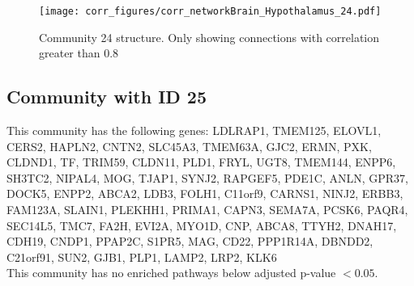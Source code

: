 \begin{figure}[h!]
\centering
\texttt{[image: corr\_figures/corr\_networkBrain\_Hypothalamus\_24.pdf]}
\caption{Community 24 structure. Only showing connections with correlation greater than 0.8}
\end{figure}




\subsection*{Community with ID 25}
This community has the following genes: LDLRAP1, TMEM125, ELOVL1, CERS2, HAPLN2, CNTN2, SLC45A3, TMEM63A, GJC2, ERMN, PXK, CLDND1, TF, TRIM59, CLDN11, PLD1, FRYL, UGT8, TMEM144, ENPP6, SH3TC2, NIPAL4, MOG, TJAP1, SYNJ2, RAPGEF5, PDE1C, ANLN, GPR37, DOCK5, ENPP2, ABCA2, LDB3, FOLH1, C11orf9, CARNS1, NINJ2, ERBB3, FAM123A, SLAIN1, PLEKHH1, PRIMA1, CAPN3, SEMA7A, PCSK6, PAQR4, SEC14L5, TMC7, FA2H, EVI2A, MYO1D, CNP, ABCA8, TTYH2, DNAH17, CDH19, CNDP1, PPAP2C, S1PR5, MAG, CD22, PPP1R14A, DBNDD2, C21orf91, SUN2, GJB1, PLP1, LAMP2, LRP2, KLK6
\\
This community has no enriched pathways below adjusted p-value $< 0.05$.

